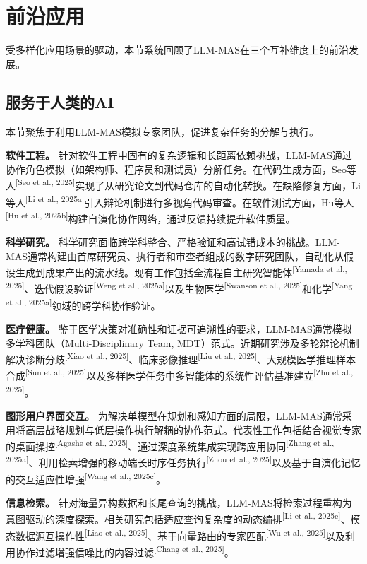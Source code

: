 \documentclass[UTF8,a4paper,12pt]{article}
\begin{document}
\newpage
\section{前沿应用}

受多样化应用场景的驱动，本节系统回顾了LLM-MAS在三个互补维度上的前沿发展。

\subsection{服务于人类的AI}

本节聚焦于利用LLM-MAS模拟专家团队，促进复杂任务的分解与执行。

\textbf{软件工程。} 针对软件工程中固有的复杂逻辑和长距离依赖挑战，LLM-MAS通过协作角色模拟（如架构师、程序员和测试员）分解任务。在代码生成方面，Seo等人\textsuperscript{[Seo et al., 2025]}实现了从研究论文到代码仓库的自动化转换。在缺陷修复方面，Li等人\textsuperscript{[Li et al., 2025a]}引入辩论机制进行多视角代码审查。在软件测试方面，Hu等人\textsuperscript{[Hu et al., 2025b]}构建自演化协作网络，通过反馈持续提升软件质量。

\textbf{科学研究。} 科学研究面临跨学科整合、严格验证和高试错成本的挑战。LLM-MAS通常构建由首席研究员、执行者和审查者组成的数字研究团队，自动化从假设生成到成果产出的流水线。现有工作包括全流程自主研究智能体\textsuperscript{[Yamada et al., 2025]}、迭代假设验证\textsuperscript{[Weng et al., 2025a]}以及生物医学\textsuperscript{[Swanson et al., 2025]}和化学\textsuperscript{[Yang et al., 2025a]}领域的跨学科协作验证。

\textbf{医疗健康。} 鉴于医学决策对准确性和证据可追溯性的要求，LLM-MAS通常模拟多学科团队（Multi-Disciplinary Team, MDT）范式。近期研究涉及多轮辩论机制解决诊断分歧\textsuperscript{[Xiao et al., 2025]}、临床影像推理\textsuperscript{[Liu et al., 2025]}、大规模医学推理样本合成\textsuperscript{[Sun et al., 2025]}以及多样医学任务中多智能体的系统性评估基准建立\textsuperscript{[Zhu et al., 2025]}。

\textbf{图形用户界面交互。} 为解决单模型在规划和感知方面的局限，LLM-MAS通常采用将高层战略规划与低层操作执行解耦的协作范式。代表性工作包括结合视觉专家的桌面操控\textsuperscript{[Agashe et al., 2025]}、通过深度系统集成实现跨应用协同\textsuperscript{[Zhang et al., 2025a]}、利用检索增强的移动端长时序任务执行\textsuperscript{[Zhou et al., 2025]}以及基于自演化记忆的交互适应性增强\textsuperscript{[Wang et al., 2025c]}。

\textbf{信息检索。} 针对海量异构数据和长尾查询的挑战，LLM-MAS将检索过程重构为意图驱动的深度探索。相关研究包括适应查询复杂度的动态编排\textsuperscript{[Li et al., 2025c]}、模态数据源互操作性\textsuperscript{[Liao et al., 2025]}、基于向量路由的专家匹配\textsuperscript{[Wu et al., 2025]}以及利用协作过滤增强信噪比的内容过滤\textsuperscript{[Chang et al., 2025]}。
\end{document}
